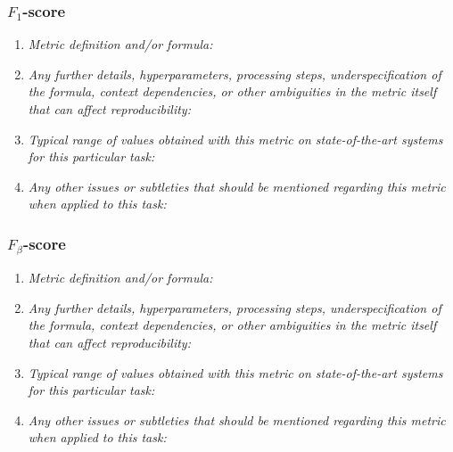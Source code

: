 \documentclass[a4paper,11pt]{article}
\begin{document}
        \subsubsection{$F_1$-score}
            \begin{enumerate}[label=\alph*.]
                \item \textit{Metric definition and/or formula:}
                \bigskip
                \item \textit{Any further details, hyperparameters, processing steps, underspecification of the formula, context dependencies, or other ambiguities in the metric itself that can affect reproducibility:}
                \bigskip
                \item \textit{Typical range of values obtained with this metric on state-of-the-art systems for this particular task:}
                \bigskip
                \item \textit{Any other issues or subtleties that should be mentioned regarding this metric when applied to this task:}
                \bigskip
            \end{enumerate}
        \subsubsection{$F_\beta$-score}
            \begin{enumerate}[label=\alph*.]
                \item \textit{Metric definition and/or formula:}
                \bigskip
                \item \textit{Any further details, hyperparameters, processing steps, underspecification of the formula, context dependencies, or other ambiguities in the metric itself that can affect reproducibility:}
                \bigskip
                \item \textit{Typical range of values obtained with this metric on state-of-the-art systems for this particular task:}
                \bigskip
                \item \textit{Any other issues or subtleties that should be mentioned regarding this metric when applied to this task:}
                \bigskip
            \end{enumerate}
\end{document}
